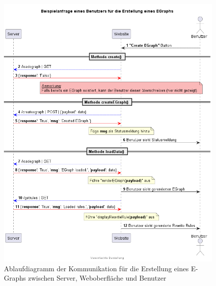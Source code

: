 \begin{figure}[H]
  \centering
  \includegraphics[scale=0.6]{../fig/query.png}
  \caption{Ablaufdiagramm der Kommunikation für die Erstellung eines E-Graphs zwischen Server, Weboberfläche und Benutzer}
  \label{fig:ablauf}
\end{figure}
